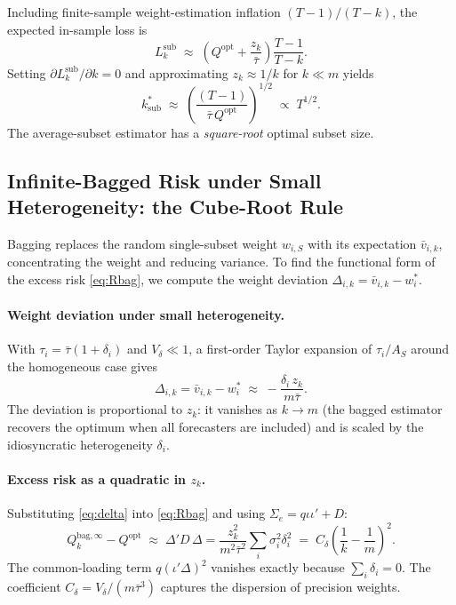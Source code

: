 \documentclass[12pt,a4paper]{article}
\begin{document}
Including finite-sample weight-estimation inflation $(T-1)/(T-k)$, the
expected in-sample loss is
\begin{equation}\label{eq:Lsub}
L_k^{\mathrm{sub}}
\;\approx\; \left(Q^{\mathrm{opt}} + \frac{z_k}{\bar\tau}\right)
            \frac{T-1}{T-k}.
\end{equation}
Setting $\partial L_k^{\mathrm{sub}}/\partial k = 0$ and approximating
$z_k \approx 1/k$ for $k \ll m$ yields
\begin{equation}\label{eq:kstar_sub}
k^*_{\mathrm{sub}} \;\approx\;
\left(\frac{(T-1)}{\bar\tau\,Q^{\mathrm{opt}}}\right)^{1/2}
\;\propto\; T^{1/2}.
\end{equation}
The average-subset estimator has a \emph{square-root} optimal subset size.

\subsection{Infinite-Bagged Risk under Small Heterogeneity: the Cube-Root Rule}

Bagging replaces the random single-subset weight $w_{i,S}$ with its
expectation $\bar v_{i,k}$, concentrating the weight and reducing variance.
To find the functional form of the excess risk \eqref{eq:Rbag}, we compute
the weight deviation $\Delta_{i,k} = \bar v_{i,k} - w^*_i$.

\paragraph{Weight deviation under small heterogeneity.}
With $\tau_i = \bar\tau(1+\delta_i)$ and $V_\delta \ll 1$, a first-order
Taylor expansion of $\tau_i/A_S$ around the homogeneous case gives
\begin{equation}\label{eq:delta}
\Delta_{i,k} = \bar v_{i,k} - w^*_i
\;\approx\; -\frac{\delta_i\,z_k}{m\bar\tau}.
\end{equation}
The deviation is proportional to $z_k$: it vanishes as $k \to m$ (the
bagged estimator recovers the optimum when all forecasters are included) and
is scaled by the idiosyncratic heterogeneity $\delta_i$.

\paragraph{Excess risk as a quadratic in $z_k$.}
Substituting \eqref{eq:delta} into \eqref{eq:Rbag} and using
$\Sigma_e = q\iota\iota' + D$:
\begin{equation}\label{eq:Rbag_smallhet}
Q_k^{\mathrm{bag},\infty} - Q^{\mathrm{opt}}
\;\approx\; \Delta'D\,\Delta
= \frac{z_k^2}{m^2\bar\tau^2}\sum_i \sigma_i^2\delta_i^2
\;=\; C_\delta\!\left(\frac{1}{k}-\frac{1}{m}\right)^{\!2}.
\end{equation}
The common-loading term $q(\iota'\Delta)^2$ vanishes exactly because
$\sum_i\delta_i = 0$. The coefficient $C_\delta = V_\delta/(m\bar\tau^3)$
captures the dispersion of precision weights.
\end{document}
